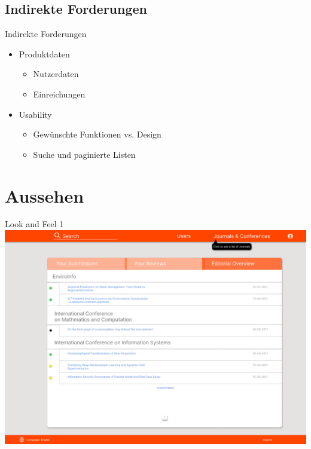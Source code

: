 \documentclass{beamer}
\begin{document}
\subsection{Indirekte Forderungen}
\begin{frame}{Indirekte Forderungen}
		\begin{itemize}
		\item Produktdaten
		\begin{itemize}
			\item Nutzerdaten
			\item Einreichungen
		\end{itemize}
		\pause
		\item Usability
		\begin{itemize}
			\item Gewünschte Funktionen vs. Design
			\item Suche und paginierte Listen
		\end{itemize}
	\end{itemize}
\end{frame}

\section{Aussehen}
\begin{frame}{Look and Feel 1}
	\centering
	\includegraphics[height=0.75\textheight]{../../docs/Pflichtenheft/graphics/Homepage-png}
\end{frame}
\end{document}
